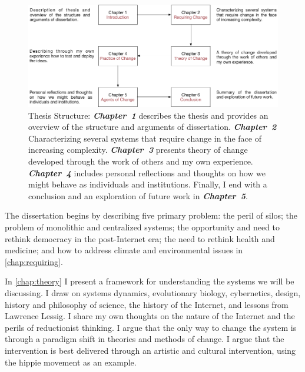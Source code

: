 \begin{figure}[t]
 \centering
 \includegraphics[width=1\textwidth]{pictures/thesisStructure2}
 \caption[Thesis Structure]{Thesis Structure: \textbf{\textit{Chapter~1}} describes the thesis and provides an overview of the structure and arguments of dissertation. \textbf{\textit{Chapter~2}} Characterizing several systems that require change in the face of increasing complexity. \textbf{\textit{Chapter~3}} presents theory of change developed through the work of others and my own experience. \textbf{\textit{Chapter~4}} includes personal reflections and thoughts on how we might behave as individuals and institutions. Finally, I end with a conclusion and an exploration of future work in \textbf{\textit{Chapter~5}}.}
 \label{fig:structure}
\end{figure}


The dissertation begins by describing five primary problem: the peril of silos; the problem of monolithic and centralized systems; the opportunity and need to rethink democracy in the post-Internet era; the need to rethink health and medicine; and how to address climate and environmental issues in \autoref{chap:requiring}.

In \autoref{chap:theory} I present a framework for understanding the systems we will be discussing. I draw on systems dynamics, evolutionary biology, cybernetics, design, history and philosophy of science, the history of the Internet, and lessons from Lawrence Lessig. I share my own thoughts on the nature of the Internet and the perils of reductionist thinking. I argue that the only way to change the system is through a paradigm shift in theories and methods of change. I argue that the intervention is best delivered through an artistic and cultural intervention, using the hippie movement as an example.

